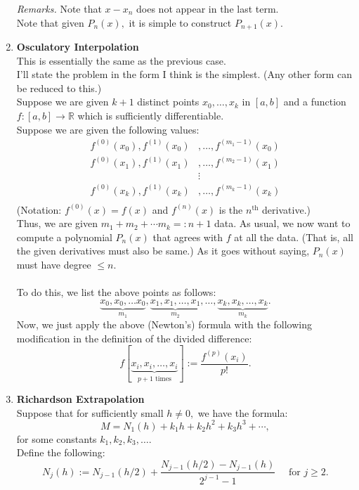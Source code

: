 \documentclass{article}
\begin{document}
\begin{enumerate}
	\emph{Remarks.} Note that $x - x_n$ does not appear in the last term.\\
	Note that given $P_n(x),$ it is simple to construct $P_{n+1}(x).$
	\item \textbf{Osculatory Interpolation}\\
	This is essentially the same as the previous case. \\
	I'll state the problem in the form I think is the simplest. (Any other form can be reduced to this.)\\
	Suppose we are given $k+1$ distinct points $x_0, \ldots, x_k$ in $[a, b]$ and a function $f:[a, b] \to \mathbb{R}$ which is sufficiently differentiable.\\
	Suppose we are given the following values:\\
	\begin{align*} 
		f^{(0)}(x_0), f^{(1)}(x_0)&, \ldots, f^{(m_1-1)}(x_0)\\
		f^{(0)}(x_1), f^{(1)}(x_1)&, \ldots, f^{(m_2-1)}(x_1)\\
		&\vdots\\
		f^{(0)}(x_k), f^{(1)}(x_k)&, \ldots, f^{(m_k-1)}(x_k)\\
	\end{align*}
	(Notation: $f^{(0)}(x) = f(x)$ and $f^{(n)}(x)$ is the $n^{\text{th}}$ derivative.)\\
	Thus, we are given $m_1 + m_2 + \cdots m_k =: n+1$ data. As usual, we now want to compute a polynomial $P_n(x)$ that agrees with $f$ at all the data. (That is, all the given derivatives must also be same.) As it goes without saying, $P_n(x)$ must have degree $\le n.$\\~\\
	To do this, we list the above points as follows:
	\[\underbrace{x_0, x_0, \ldots x_0}_{m_1}, \underbrace{x_1, x_1, \ldots, x_1}_{m_2}, \ldots, \underbrace{x_k, x_k, \ldots, x_k}_{m_k}.\]
	Now, we just apply the above (Newton's) formula with the following modification in the definition of the divided difference:
	\[f[\underbrace{x_i, x_i, \ldots, x_i}_{p+1 \text{ times}}] := \dfrac{f^{(p)}(x_i)}{p!}.\]
	\item \label{rich}\textbf{Richardson Extrapolation}\\
	Suppose that for sufficiently small $h \neq 0,$ we have the formula:
	\[M = N_1(h) + k_1h + k_2h^2 + k_3h^3 + \cdots,\]
	for some constants $k_1, k_2, k_3,\ldots.$\\
	Define the following:
	\[N_j(h) := N_{j-1}(h/2) + \frac{N_{j-1}(h/2) - N_{j-1}(h)}{2^{j-1} - 1} \quad \text{ for } j \ge 2.\]

\end{enumerate}
\end{document}
